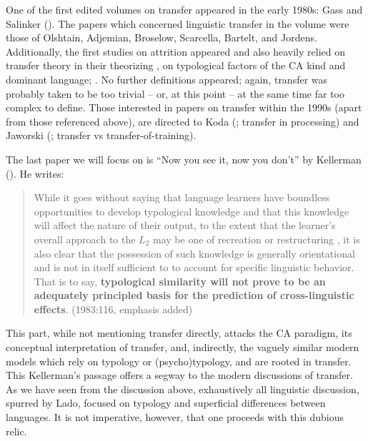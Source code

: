 \documentclass{article}
\begin{document}

One of the first edited volumes on transfer appeared in the early 1980s: Gass and Salinker (\citeyear{gass_language_1983}). The papers which concerned linguistic transfer in the volume were those of Olshtain, Adjemian, Broselow, Scarcella, Bartelt, and Jordens. Additionally, the first studies on attrition appeared and also heavily relied on transfer theory in their theorizing \citep[e.g.,][]{olshtain_is_1989}, on typological factors of the CA kind and dominant language; \citep{berman_features_1983, sharwood_smith_first_1983}. No further definitions appeared; again, transfer was probably taken to be too trivial -- or, at this point -- at the same time far too complex to define. Those interested in papers on transfer within the 1990s (apart from those referenced above), are directed to Koda (\citeyear{koda_use_1990}; transfer in processing) and Jaworski (\citeyear{jaworski_acquisition_1990}; transfer vs transfer-of-training).

The last paper we will focus on is ``Now you see it, now you don’t'' by Kellerman (\citeyear{kellerman_now_1983}). He writes: 

\begin{quote}
    While it goes without saying that language learners have boundless opportunities to develop typological knowledge and that this knowledge will affect the nature of their output, to the extent that the learner's overall approach to the $L_2$ may be one of recreation or restructuring \citep{corder_language_1979}, it is also clear that the possession of such knowledge is generally orientational and is not in itself sufficient to to account for specific linguistic behavior. That is to say, \textbf{typological similarity will not prove to be an adequately principled basis for the prediction of cross-linguistic effects}. (1983:116, emphasis added)
\end{quote}

This part, while not mentioning transfer directly, attacks the CA paradigm, its conceptual interpretation of transfer, and, indirectly, the vaguely similar modern models which rely on typology or (psycho)typology, and are rooted in transfer. This Kellerman’s passage offers a segway to the modern discussions of transfer. As we have seen from the discussion above, exhaustively all linguistic discussion, spurred by Lado, focused on typology and superficial differences between languages. It is not imperative, however, that one proceeds with this dubious relic.
\end{document}
